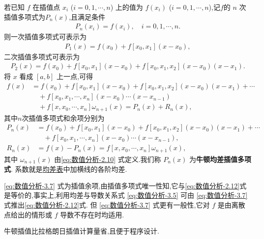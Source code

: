 \documentclass[../../main.tex]{subfiles}
\begin{document}
\begin{theorem}[牛顿均差插值多项式]\label{theorem:牛顿均差插值多项式}
若已知 $f$ 在插值点 $x_i$ ($i = 0, 1, \cdots, n$) 上的值为 $f(x_i)$ ($i = 0, 1, \cdots, n$),记$f$的 $n$ 次插值多项式为$P_n(x)$,且满足条件
\begin{align}
P_n(x_i) = f(x_i), \quad i = 0, 1, \cdots, n. \label{eq:数值分析-3.1}
\end{align}
则一次插值多项式可表示为
\begin{align*}
P_1(x) = f(x_0) + f[x_0, x_1](x - x_0),
\end{align*}
二次插值多项式可表示为
\begin{align*}
P_2(x) = f(x_0) + f[x_0, x_1](x - x_0) + f[x_0, x_1, x_2](x - x_0)(x - x_1).
\end{align*}
将 $x$ 看成 $[a, b]$ 上一点,可得
\begin{align*}
f(x) &= f(x_0) + f[x_0, x_1](x - x_0) + f[x_0, x_1, x_2](x - x_0)(x - x_1) + \cdots \\
&\quad + f[x_0, x_1, \cdots, x_n](x - x_0) \cdots (x - x_{n-1}) \\
&\quad + f[x, x_0, \cdots, x_n]\omega_{n+1}(x) = P_n(x) + R_n(x),
\end{align*}
其中$n$次插值多项式和余项分别为
\begin{align}
P_n(x) &= f(x_0) + f[x_0, x_1](x - x_0) + f[x_0, x_1, x_2](x - x_0)(x - x_1) + \cdots \nonumber  \\
&\quad + f[x_0, x_1, \cdots, x_n](x - x_0) \cdots (x - x_{n-1}),\label{eq:数值分析-3.6} \\
R_n(x) &= f(x) - P_n(x) = f[x, x_0, \cdots, x_n]\omega_{n+1}(x),\label{eq:数值分析-3.7}
\end{align}
其中 $\omega_{n+1}(x)$ 由\eqref{eq:数值分析-2.10} 式定义.我们称 $P_n(x)$ 为\textbf{牛顿均差插值多项式}. 系数就是\hyperref[table:均差表]{均差表}中加横线的各阶均差.
\end{theorem}
\begin{remark}
\eqref{eq:数值分析-3.7} 式为插值余项,由插值多项式唯一性知,它与\eqref{eq:数值分析-2.12}式是等价的,事实上,利用均差与导数关系式 \eqref{eq:数值分析-3.5} 可由 \eqref{eq:数值分析-3.7} 式推出\eqref{eq:数值分析-2.12}式. 但 \eqref{eq:数值分析-3.7} 式更有一般性,它对 $f$ 是由离散点给出的情形或 $f$ 导数不存在时均适用.
\end{remark}
\begin{remark}
牛顿插值比拉格朗日插值计算量省,且便于程序设计.
\end{remark}
\end{document}
